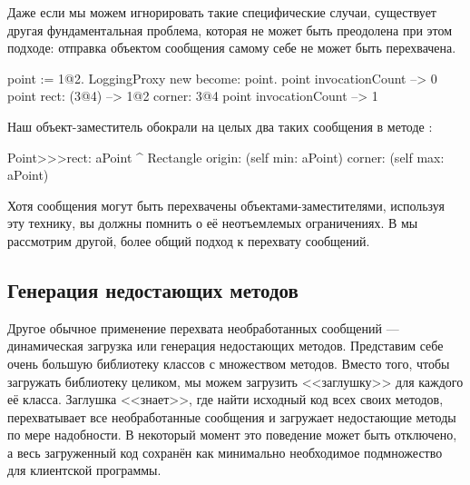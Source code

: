 \documentclass[a4paper,10pt,twoside]{book}
\begin{document}
Даже если мы можем игнорировать такие специфические случаи, существует другая фундаментальная проблема, которая не может быть преодолена при этом подходе: отправка объектом сообщения самому себе не может быть перехвачена.
\begin{code}{}
point := 1@2.
LoggingProxy new become: point.
point invocationCount --> 0
point rect: (3@4)        --> 1@2 corner: 3@4
point invocationCount --> 1
\end{code}

Наш объект-заместитель обокрали на целых два таких сообщения в методе :
\begin{code}{}
Point>>>rect: aPoint 
	^ Rectangle  origin: (self min: aPoint) corner: (self max: aPoint)
\end{code}

Хотя сообщения могут быть перехвачены объектами-заместителями, используя эту технику, вы должны помнить о её неотъемлемых ограничениях. В  мы рассмотрим другой, более общий подход к перехвату сообщений.

\subsection{Генерация недостающих методов}

Другое обычное применение перехвата необработанных сообщений --- динамическая загрузка или генерация недостающих методов.
Представим себе очень большую библиотеку классов с множеством методов. Вместо того, чтобы загружать библиотеку целиком, мы можем загрузить <<заглушку>> для каждого её класса. Заглушка <<знает>>, где найти исходный код всех своих методов, перехватывает все необработанные сообщения и загружает недостающие методы по мере надобности. В некоторый момент это поведение может быть отключено, а весь загруженный код сохранён как минимально необходимое подмножество для клиентской программы.
\end{document}
